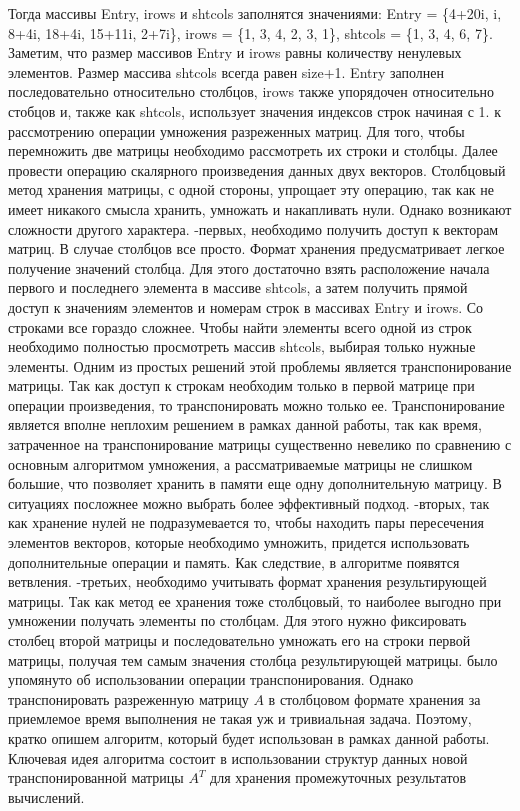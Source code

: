 \documentclass{report}
\begin{document}
Тогда массивы Entry, irows и shtcols заполнятся значениями: Entry = \{4+20i, i, 8+4i, 18+4i, 15+11i, 2+7i\}, irows = \{1, 3, 4, 2, 3, 1\}, shtcols = \{1, 3, 4, 6, 7\}. Заметим, что размер массивов Entry и irows равны количеству ненулевых элементов. Размер массива shtcols всегда равен size+1. Entry заполнен последовательно относительно столбцов, irows также упорядочен относительно стобцов и, также как shtcols, использует значения индексов строк начиная с 1.
 к рассмотрению операции умножения разреженных матриц. Для того, чтобы перемножить две матрицы необходимо рассмотреть их строки и столбцы. Далее провести операцию скалярного произведения данных двух векторов. Столбцовый метод хранения матрицы, с одной стороны, упрощает эту операцию, так как не имеет никакого смысла хранить, умножать и накапливать нули. Однако возникают сложности другого характера.
-первых, необходимо получить доступ к векторам матриц. В случае столбцов все просто. Формат хранения предусматривает легкое получение значений столбца. Для этого достаточно взять расположение начала первого и последнего элемента в массиве shtcols, а затем получить прямой доступ к значениям элементов и номерам строк в массивах Entry и irows. Со строками все гораздо сложнее. Чтобы найти элементы всего одной из строк необходимо полностью просмотреть массив shtcols, выбирая только нужные элементы. Одним из простых решений этой проблемы является транспонирование матрицы. Так как доступ к строкам необходим только в первой матрице при операции произведения, то транспонировать можно только ее. Транспонирование является вполне неплохим решением в рамках данной работы, так как время, затраченное на транспонирование матрицы существенно невелико по сравнению с основным алгоритмом умножения, а рассматриваемые матрицы не слишком большие, что позволяет хранить в памяти еще одну дополнительную матрицу. В ситуациях посложнее можно выбрать более эффективный подход.
-вторых, так как хранение нулей не подразумевается то, чтобы находить пары пересечения элементов векторов, которые необходимо умножить, придется использовать дополнительные операции и память. Как следствие, в алгоритме появятся ветвления.
-третьих, необходимо учитывать формат хранения результирующей матрицы. Так как метод ее хранения тоже столбцовый, то наиболее выгодно при умножении получать элементы по столбцам. Для этого нужно фиксировать столбец второй матрицы и последовательно умножать его на строки первой матрицы, получая тем самым значения столбца результирующей матрицы.
 было упомянуто об использовании операции транспонирования. Однако транспонировать разреженную матрицу $A$ в столбцовом формате хранения за приемлемое время выполнения не такая уж и тривиальная задача. Поэтому, кратко опишем алгоритм, который будет использован в рамках данной работы. Ключевая идея алгоритма состоит в использовании структур данных новой транспонированной матрицы $A^T$ для хранения промежуточных результатов вычислений.
\end{document}
